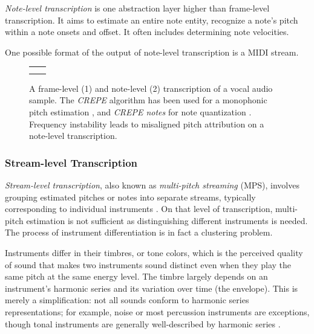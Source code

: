 \emph{Note-level transcription} is one abstraction layer higher than frame-level transcription. It aims to estimate an entire note entity, recognize a note's pitch within a note onsets and offset. It often includes determining note velocities.

One possible format of the output of note-level transcription is a MIDI stream.

\begin{figure}[ht!]
\centering
\begin{tabular}{>{\centering\arraybackslash} m{} >{\centering\arraybackslash} m{}}
1 & \\
2 & 
\end{tabular}
\caption[A frame-level and note-level transcription of a vocal audio sample.]{A frame-level (1) and note-level (2) transcription of a vocal audio sample. The \emph{CREPE} algorithm has been used for a monophonic pitch estimation \cite{Kim2018}, and \emph{CREPE notes} for note quantization \cite{Riley2023}. Frequency instability leads to misaligned pitch attribution on a note-level transcription.}
\end{figure}

\subsubsection{Stream-level Transcription}

\emph{Stream-level transcription}, also known as \emph{multi-pitch streaming} (MPS), involves grouping estimated pitches or notes into separate streams, typically corresponding to individual instruments \cite{Bhattarai2023}. On that level of transcription, multi-pitch estimation is not sufficient as distinguishing different instruments is needed. The process of instrument differentiation is in fact a clustering problem.

Instruments differ in their timbres, or tone colors, which is the perceived quality of sound that makes two instruments sound distinct even when they play the same pitch at the same energy level. The timbre largely depends on an instrument's harmonic series and its variation over time (the envelope). This is merely a simplification: not all sounds conform to harmonic series representations; for example, noise or most percussion instruments are exceptions, though tonal instruments are generally well-described by harmonic series \cite[p.~27--28]{Sethares2005}.

